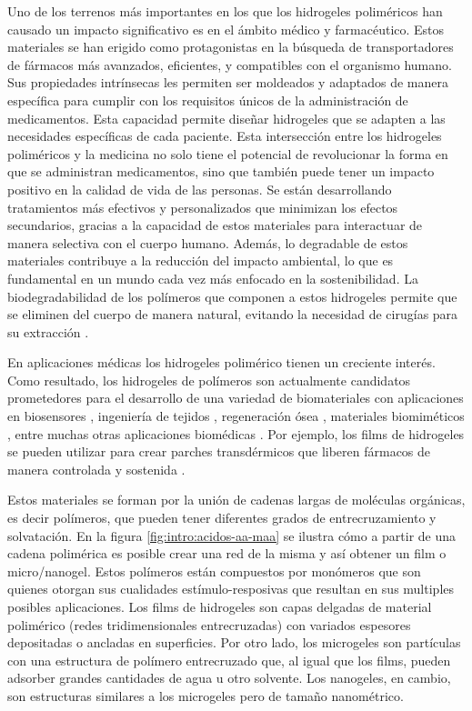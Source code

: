  Uno de los terrenos m\'as importantes en los que los hidrogeles polim\'ericos han causado un impacto significativo es en el \'ambito m\'edico y farmac\'eutico. Estos materiales se han erigido como protagonistas en la b\'usqueda de transportadores de f\'armacos m\'as avanzados, eficientes, y compatibles con el organismo humano. Sus propiedades intr\'insecas les permiten ser moldeados y adaptados de manera espec\'ifica para cumplir con los requisitos \'unicos de la administraci\'on de medicamentos.
Esta capacidad permite dise\~nar hidrogeles  que se adapten a las necesidades espec\'ificas de cada paciente.
Esta intersecci\'on entre los hidrogeles polim\'ericos y la medicina no solo tiene el potencial de revolucionar la forma en que se administran medicamentos, sino que tambi\'en puede tener un impacto positivo en la calidad de vida de las personas. Se est\'an desarrollando tratamientos m\'as efectivos y personalizados que minimizan los efectos secundarios, gracias a la capacidad de estos materiales para interactuar de manera selectiva con el cuerpo humano. Adem\'as, lo degradable de estos materiales contribuye a la reducci\'on del impacto ambiental, lo que es fundamental en un mundo cada vez m\'as enfocado en la sostenibilidad.
La biodegradabilidad de los pol\'imeros que componen a estos hidrogeles permite que se eliminen del cuerpo de manera natural, evitando la necesidad de cirug\'ias para su extracci\'on \cite{samir2022recent}.

En aplicaciones m\'edicas los hidrogeles polim\'erico tienen  un creciente inter\'es. 
Como resultado, los hidrogeles de pol\'imeros son actualmente candidatos prometedores para el desarrollo de una variedad de biomateriales con aplicaciones en biosensores \cite{zhang2012ultrathin,islam2014responsive}, ingenier\'ia de tejidos \cite{matricardi2013interpenetrating,van2011biopolymer}, regeneraci\'on \'osea \cite{bai2018bioactive}, materiales biomim\'eticos \cite{green2016mimicking,wu2010multifunctional}, entre muchas otras aplicaciones biom\'edicas \cite{Daly2020}.
Por ejemplo, los films de  hidrogeles se pueden utilizar para crear parches transd\'ermicos que liberen f\'armacos de manera controlada y sostenida  \cite{indulekha2016thermoresponsive}.

Estos materiales se forman por la uni\'on de cadenas largas de mol\'eculas org\'anicas, es decir pol\'imeros, que pueden tener diferentes grados de entrecruzamiento y solvataci\'on. En la figura \ref{fig:intro:acidos-aa-maa} se ilustra c\'omo a partir de una cadena polim\'erica es posible crear una red de la misma y as\'i obtener un film o micro/nanogel. Estos pol\'imeros est\'an compuestos por mon\'omeros que son quienes otorgan sus cualidades est\'imulo-resposivas que resultan en sus multiples posibles aplicaciones.
Los films de hidrogeles son capas delgadas de material polim\'erico (redes tridimensionales entrecruzadas) con variados espesores depositadas o ancladas en superficies. Por otro lado, los microgeles son part\'iculas con una estructura de pol\'imero entrecruzado que, al igual que los films, pueden adsorber grandes cantidades de agua u otro solvente. Los nanogeles, en cambio, son estructuras similares a los microgeles pero de tama\~no nanom\'etrico.

